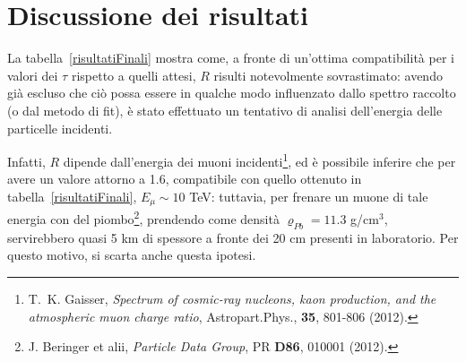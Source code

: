 \documentclass[10pt, oneside, a4paper]{article}   	%
\renewcommand{\rho}{\varrho}				%
\begin{document}
\section{Discussione dei risultati}

La tabella~\ref{risultatiFinali} mostra come, a fronte di un'ottima compatibilità per i valori dei $\tau$ rispetto a quelli attesi, $R$ risulti notevolmente sovrastimato: avendo già escluso che ciò possa essere in qualche modo influenzato dallo spettro raccolto (o dal metodo di fit), è stato effettuato un tentativo di analisi dell'energia delle particelle incidenti.

Infatti, $R$ dipende dall'energia dei muoni incidenti\footnote{T.~K. Gaisser, \emph{Spectrum of cosmic-ray nucleons, kaon production, and the atmospheric muon charge ratio}, Astropart.Phys., \textbf{35}, 801-806 (2012).}, ed è possibile inferire che per avere un valore attorno a 1.6, compatibile con quello ottenuto in tabella~\ref{risultatiFinali}, $E_{\mu} \sim 10$ TeV: tuttavia, per frenare un muone di tale energia con del piombo\footnote{J. Beringer et alii, \emph{Particle Data Group}, PR \textbf{D86}, 010001 (2012).}, prendendo come densità $ \rho_{Pb} = 11.3 $ g/cm$^3$, servirebbero quasi 5 km di spessore a fronte dei 20 cm presenti in laboratorio. Per questo motivo, si scarta anche questa ipotesi. %

\appendix


\end{document}

